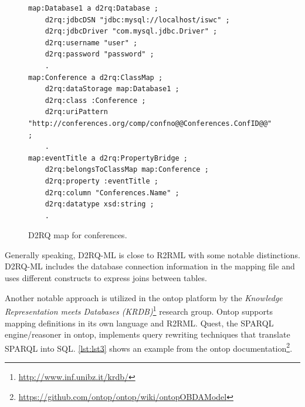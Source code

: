 

\begin{figure}[!h]
\centering
\begin{verbatim}
map:Database1 a d2rq:Database ;
    d2rq:jdbcDSN "jdbc:mysql://localhost/iswc" ;
    d2rq:jdbcDriver "com.mysql.jdbc.Driver" ;
    d2rq:username "user" ;
    d2rq:password "password" ;
    .
map:Conference a d2rq:ClassMap ;
    d2rq:dataStorage map:Database1 ;
    d2rq:class :Conference ;
    d2rq:uriPattern "http://conferences.org/comp/confno@@Conferences.ConfID@@" ;
    .
map:eventTitle a d2rq:PropertyBridge ;
    d2rq:belongsToClassMap map:Conference ;
    d2rq:property :eventTitle ;
    d2rq:column "Conferences.Name" ;
    d2rq:datatype xsd:string ;
    .
\end{verbatim}
\caption{D2RQ map for conferences.}
\label{lst:lst2}
\end{figure}


  Generally speaking, D2RQ-ML is close to R2RML with some notable distinctions.
D2RQ-ML includes the database connection information in the mapping file and uses different constructs to express joins between tables.

Another notable approach is utilized in the ontop\cite{ontop} platform by the
\emph{Knowledge Representation meets Databases (KRDB)}\footnote{\url{http://www.inf.unibz.it/krdb/}} research group.
Ontop supports mapping definitions in its own language and R2RML.
Quest, the SPARQL engine/reasoner in ontop, implements query rewriting techniques that translate SPARQL into SQL.
\autoref{lst:lst3} shows an example from the ontop
documentation\footnote{\url{https://github.com/ontop/ontop/wiki/ontopOBDAModel}}.

